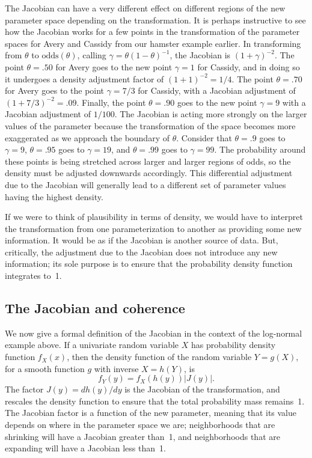 \documentclass[man]{apa}
\newcommand{\oddss}{\text{odds}}
\begin{document}
The Jacobian can have a very different effect on different regions of the new parameter space depending on the transformation. It is perhaps instructive to see how the Jacobian works for a few points in the transformation of the parameter spaces for Avery and Cassidy from our hamster example earlier. In transforming from $\theta$ to $\oddss(\theta)$, calling $\gamma={\theta}(1-\theta)^{-1}$, the Jacobian is $(1+\gamma)^{-2}$. The point $\theta=.50$ for Avery goes to the new point $\gamma=1$ for Cassidy, and in doing so it undergoes a density adjustment factor of $(1+1)^{-2} = 1/4$. The point $\theta=.70$ for Avery goes to the point $\gamma=7/3$ for Cassidy, with a Jacobian adjustment of $(1+7/3)^{-2}=.09$. Finally, the point $\theta=.90$ goes to the new point $\gamma=9$ with a Jacobian adjustment of $1/100$.  
The Jacobian is acting more strongly on the larger values of the parameter because the transformation of the space becomes more exaggerated as we approach the boundary of $\theta$. Consider that $\theta=.9$ goes to $\gamma=9$, $\theta=.95$ goes to $\gamma=19$, and $\theta=.99$ goes to $\gamma=99$. The probability around these points is being stretched across larger and larger regions of odds, so the density must be adjusted downwards accordingly. This differential adjustment due to the Jacobian will generally lead to a different set of parameter values having the highest density.

If we were to think of plausibility in terms of density, we would have to interpret the transformation from one parameterization to another as providing some new information. It would be as if the Jacobian is another source of data. But, critically, the adjustment due to the Jacobian does not introduce any new information; its sole purpose is to ensure that the probability density function integrates to~1. 

\subsection{The Jacobian and coherence} \label{subsection:jacobian}
We now give a formal definition of the Jacobian in the context of the log-normal example above. If a univariate random variable $X$ has probability density function $f_X(x)$, then the density function of the random variable $Y=g(X)$, for a smooth function $g$ with inverse $X = h(Y)$, is 
\begin{equation}\label{eq:jacobian}
f_Y(y) = f_X(h(y))  \left|J(y)\right|.
\end{equation}
The factor $J(y) = dh(y)/dy$ is the Jacobian of the transformation, and rescales the density function to ensure that the total probability mass remains~1. The Jacobian factor is a function of the new parameter, meaning that its value depends on where in the parameter space we are; neighborhoods that are shrinking will have a Jacobian greater than~1, and neighborhoods that are expanding will have a Jacobian less than~1.
\end{document}
